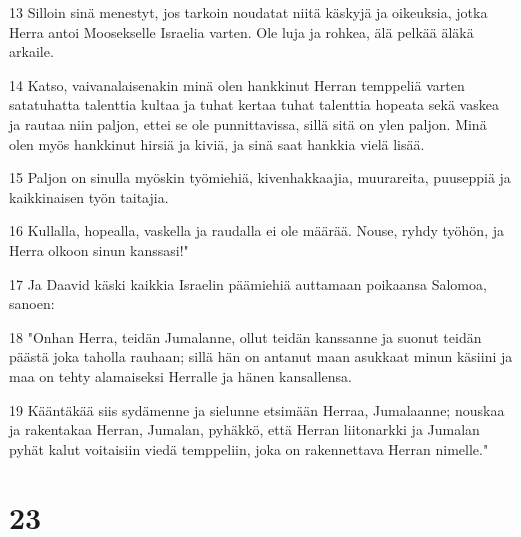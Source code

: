 \par 13 Silloin sinä menestyt, jos tarkoin noudatat niitä käskyjä ja oikeuksia, jotka Herra antoi Moosekselle Israelia varten. Ole luja ja rohkea, älä pelkää äläkä arkaile.
\par 14 Katso, vaivanalaisenakin minä olen hankkinut Herran temppeliä varten satatuhatta talenttia kultaa ja tuhat kertaa tuhat talenttia hopeata sekä vaskea ja rautaa niin paljon, ettei se ole punnittavissa, sillä sitä on ylen paljon. Minä olen myös hankkinut hirsiä ja kiviä, ja sinä saat hankkia vielä lisää.
\par 15 Paljon on sinulla myöskin työmiehiä, kivenhakkaajia, muurareita, puuseppiä ja kaikkinaisen työn taitajia.
\par 16 Kullalla, hopealla, vaskella ja raudalla ei ole määrää. Nouse, ryhdy työhön, ja Herra olkoon sinun kanssasi!"
\par 17 Ja Daavid käski kaikkia Israelin päämiehiä auttamaan poikaansa Salomoa, sanoen:
\par 18 "Onhan Herra, teidän Jumalanne, ollut teidän kanssanne ja suonut teidän päästä joka taholla rauhaan; sillä hän on antanut maan asukkaat minun käsiini ja maa on tehty alamaiseksi Herralle ja hänen kansallensa.
\par 19 Kääntäkää siis sydämenne ja sielunne etsimään Herraa, Jumalaanne; nouskaa ja rakentakaa Herran, Jumalan, pyhäkkö, että Herran liitonarkki ja Jumalan pyhät kalut voitaisiin viedä temppeliin, joka on rakennettava Herran nimelle."

\chapter{23}

